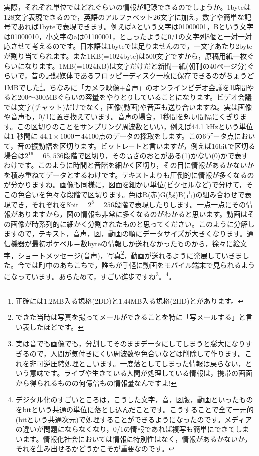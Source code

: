 \documentclass{ltjsbook}
\begin{document}
実際，それぞれ単位ではどれぐらいの情報が記録できるのでしょうか。1byteは128文字表現できるので，英語のアルファベット26文字に加え，数字や簡単な記号であれば1byteで表現できます。例えばAという文字は01000001，Bという文字は01000010，小文字のaは01100001，と言ったように0/1の文字列8個と一対一対応させて考えるのです。日本語は1byteでは足りませんので，一文字あたり2byteが割り当てられます。また1KB(=1024byte)は500文字ですから，原稿用紙一枚ぐらいになります。1MB(=1024KB)は文字だけだと新聞一紙(朝刊の40ページ分)ぐらいで，昔の記録媒体であるフロッピーディスク一枚に保存できるのがちょうど1MBでした\footnote{正確には1.2MB入る規格(2DD)と1.44MB入る規格(2HD)とがあります。}。ちなみに「カメラ映像+音声」のオンラインビデオ会議を1時間やると200〜300MBぐらいの容量をやりとりしていることになります。ビデオ会議では文字(チャット)だけでなく，画像(動画)や音声も送り合いますね。実は画像や音声も，0/1に置き換えています。音声の場合，1秒間を短い間隔にくぎります。この区切りのことをサンプリング周波数といい，例えば44.1 kHzという単位は1 秒間に $44.1 \times 1000 ＝ 44100$点のデータの採取をします。この6データ点において，音の振動幅を区切ります。ビットレートと言いますが，例えば16bitで区切る場合は2$^16=65,536$段階で区切り，その高さのおとがある(1)かない(0)かで表すわけです。このように時間と音階を細かく区切り，その目に情報があるかないかを積み重ねてデータとするわけです。テキストよりも圧倒的に情報が多くなるのが分かりますね。画像も同様に，図面を細かい単位(ピクセルなど)で分けて，そこの色合いを色々な段階で区切ります。色はR(赤)G(緑)B(青)の組み合わせで表現でき，それぞれを8bit$=2^8=256$段階で表現したりします。一点一点にその情報がありますから，図の情報も非常に多くなるのがわかると思います。動画はその画像が時系列的に細かく分割されたものと思ってください。このように分解しますので，テキスト，音声，図，動画の順にデータサイズが大きくなります。通信機器が最初ポケベル＝数byteの情報しか送れなかったものから，徐々に絵文字，ショートメッセージ(音声)，写真\footnote{できた当時は写真を撮ってメールができることを特に「写メールする」と言い表したほどです。}，動画が送れるように発展していきました。今では町中のあちこちで，誰もが手軽に動画をモバイル端末で見られるようになっています。あらためて，すごい進歩ですね\footnote{実は音でも画像でも，分割してそのままデータにしてしまうと膨大になりすぎるので，人間が気付きにくい周波数や色合いなどは削除して作ります。これを非可逆圧縮処理と言います。一度落としてしまった情報は戻らない，という意味です。ライブや生きている人間が処理している情報は，携帯の画面から得られるものの何億倍もの情報量なんですよ!}。\footnote{デジタル化のすごいところは，こうした文字，音，図版，動画といったものをbitという共通の単位に落とし込んだことです。こうすることで全て一元的(bitという共通次元)で処理することができるようになったのです。メディアの違いが問題にならなくなり，0/1の情報であれば複写も簡単にできてしまいます。情報化社会においては情報に特別性はなく，情報があるかないか，それを生み出せるかどうかこそが重要なのです。}。
\end{document}
